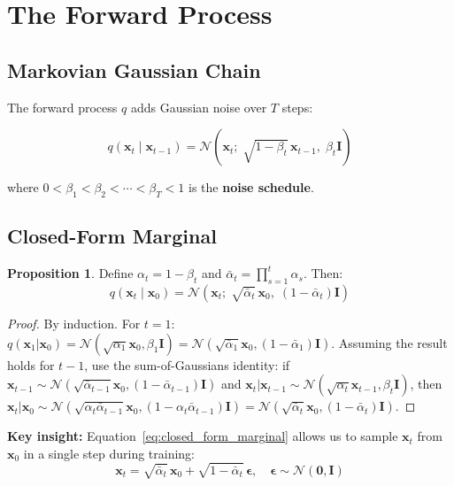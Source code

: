 \documentclass[11pt, a4paper]{article}
\theoremstyle{definition}
\newtheorem{proposition}{Proposition}[section]
\newcommand{\bx}{\bm{x}}
\newcommand{\bepsilon}{\bm{\epsilon}}
\newcommand{\bI}{\bm{I}}
\newcommand{\N}{\mathcal{N}}
\newcommand{\abar}{\bar{\alpha}}
\begin{document}
\section{The Forward Process}

\subsection{Markovian Gaussian Chain}

The forward process $q$ adds Gaussian noise over $T$ steps:

\begin{equation}
  q(\bx_t \mid \bx_{t-1}) = \N\!\left(\bx_t;\; \sqrt{1-\beta_t}\,\bx_{t-1},\; \beta_t\bI\right)
  \label{eq:forward_step}
\end{equation}

where $0 < \beta_1 < \beta_2 < \cdots < \beta_T < 1$ is the \textbf{noise schedule}.

\subsection{Closed-Form Marginal}

\begin{proposition}
Define $\alpha_t = 1-\beta_t$ and $\abar_t = \prod_{s=1}^t \alpha_s$. Then:
\begin{equation}
  \boxed{q(\bx_t \mid \bx_0) = \N\!\left(\bx_t;\; \sqrt{\abar_t}\,\bx_0,\;
    (1-\abar_t)\bI\right)}
  \label{eq:closed_form_marginal}
\end{equation}
\end{proposition}

\begin{proof}
By induction. For $t=1$: $q(\bx_1|\bx_0) = \N(\sqrt{\alpha_1}\bx_0, \beta_1\bI) =
\N(\sqrt{\abar_1}\bx_0, (1-\abar_1)\bI)$. Assuming the result holds for $t-1$, use the
sum-of-Gaussians identity: if $\bx_{t-1} \sim \N(\sqrt{\abar_{t-1}}\bx_0, (1-\abar_{t-1})\bI)$
and $\bx_t | \bx_{t-1} \sim \N(\sqrt{\alpha_t}\bx_{t-1}, \beta_t\bI)$, then
$\bx_t | \bx_0 \sim \N(\sqrt{\alpha_t \abar_{t-1}}\bx_0, (1 - \alpha_t\abar_{t-1})\bI)
= \N(\sqrt{\abar_t}\bx_0, (1-\abar_t)\bI)$.
\end{proof}

\textbf{Key insight:} Equation~\eqref{eq:closed_form_marginal} allows us to sample $\bx_t$
from $\bx_0$ in a single step during training:
\begin{equation}
  \bx_t = \sqrt{\abar_t}\,\bx_0 + \sqrt{1-\abar_t}\,\bepsilon, \quad \bepsilon \sim \N(\bm{0}, \bI)
\end{equation}
\end{document}
